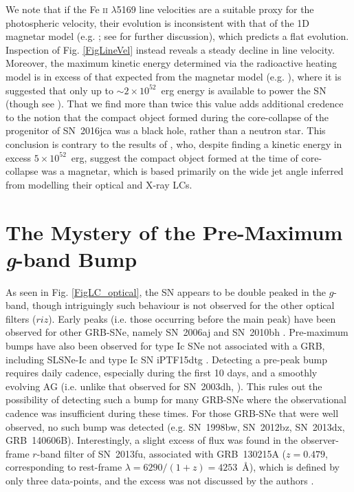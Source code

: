 \documentclass[traditabstract,longauth]{aa}
\begin{document}
We note that if the Fe \textsc{ii} $\lambda$5169 line velocities are a suitable proxy for the photospheric velocity, their evolution is inconsistent with that of the 1D magnetar model (e.g. \citealt{KasenBild10,Wang17}; see \citealt{Cano2016} for further discussion), which predicts a flat evolution.  Inspection of Fig. \ref{FigLineVel} instead reveals a steady decline in line velocity.  Moreover, the maximum kinetic energy determined via the radioactive heating model is in excess of that expected from the magnetar model (e.g. \citealt{Usov92}), where it is suggested that only up to $\sim 2\times10^{52}$~erg energy is available to power the SN (though see \citealt{Metzger15}).  That we find more than twice this value adds additional credence to the notion that the compact object formed during the core-collapse of the progenitor of SN~2016jca was a black hole, rather than a neutron star.  This conclusion is contrary to the results of \citet{Ashall17}, who, despite finding a kinetic energy in excess $5\times10^{52}$~erg, suggest the compact object formed at the time of core-collapse was a magnetar, which is based primarily on the wide jet angle inferred from modelling their optical and X-ray LCs.




\section{The Mystery of the Pre-Maximum \textit{g}-band Bump}
\label{sec:gbandLC}





As seen in Fig. \ref{FigLC_optical}, the SN appears to be double peaked in the $g$-band, though intriguingly such behaviour is not observed for the other optical filters ($riz$).  Early peaks (i.e. those occurring before the main peak) have been observed for other GRB-SNe, namely SN~2006aj \citep{Campana06} and SN~2010bh \citep{Cano2011b,Olivares12}. Pre-maximum bumps have also been observed for type Ic SNe not associated with a GRB, including SLSNe-Ic \citep{Leloudas12,Nicholl15,Smith16} and type Ic SN iPTF15dtg \citep{Taddia16}.  Detecting a pre-peak bump requires daily cadence, especially during the first 10 days, and a smoothly evolving AG (i.e. unlike that observed for SN~2003dh, \citealt{Matheson03}).  This rules out the possibility of detecting such a bump for many GRB-SNe where the observational cadence was insufficient during these times.  For those GRB-SNe that were well observed, no such bump was detected (e.g. SN~1998bw, SN~2012bz, SN~2013dx, GRB~140606B).  Interestingly, a slight excess of flux was found in the observer-frame $r$-band filter of SN~2013fu, associated with GRB~130215A ($z=0.479$, corresponding to rest-frame $\lambda = 6290/(1+z)=4253$~\AA), which is defined by only three data-points, and the excess was not discussed by the authors \citep{Cano15}.
\end{document}
